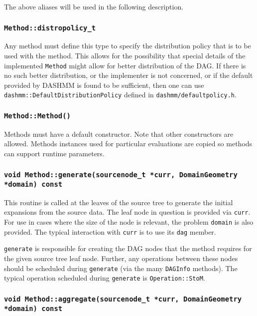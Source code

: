 \noindent The above aliases will be used in the following description.

\subsubsection{\texttt{Method::distropolicy\_t}}

Any method must define this type to specify the distribution policy that is to
be used with the method. This allows for the possibility that special details
of the implemented \texttt{Method} might allow for better distribution of the
DAG. If there is no such better distribution, or the implementer is not
concerned, or if the default provided by DASHMM is found to be sufficient, then
one can use \texttt{dashmm::DefaultDistributionPolicy} defined in
\texttt{dashmm/defaultpolicy.h}.

\subsubsection{\texttt{Method::Method()}}

Methods must have a default constructor. Note that other constructors are
allowed. Methods instances used for particular evaluations are copied so
methods can support runtime parameters.

\subsubsection{\texttt{void Method::generate(sourcenode\_t *curr, DomainGeometry *domain) const}}

This routine is called at the leaves of the source tree to generate the initial
expansions from the source data. The leaf node in question is provided via
\texttt{curr}. For use in cases where the size of the node is relevant,
the problem \texttt{domain} is also provided. The typical interaction with
\texttt{curr} is to use its \texttt{dag} member.

\texttt{generate} is responsible for creating the DAG nodes that the method
requires for the given source tree leaf node. Further, any operations between
these nodes should be scheduled during \texttt{generate} (via the many
\texttt{DAGInfo} methods). The typical operation scheduled during
\texttt{generate} is \texttt{Operation::StoM}.


\subsubsection{\texttt{void Method::aggregate(sourcenode\_t *curr, DomainGeometry *domain) const}}

